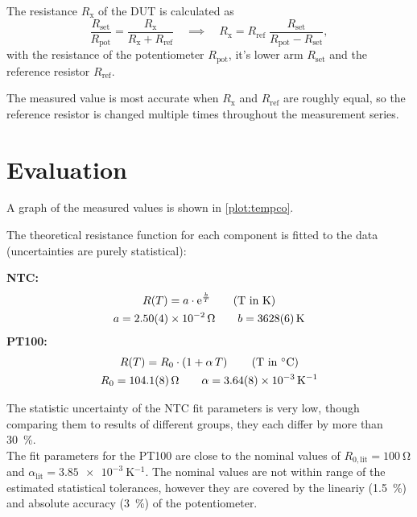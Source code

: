 The resistance $R_\text{x}$ of the DUT is calculated as
\begin{equation}
	\frac{R_\text{set}}{R_\text{pot}} = \frac{R_\text{x}}{R_\text{x} + R_\text{ref}}
	\quad \implies \quad R_\text{x} = R_\text{ref} \; \frac{R_\text{set}}{R_\text{pot} - R_\text{set}},
\end{equation}
with the resistance of the potentiometer $R_\text{pot}$, it's lower arm $R_\text{set}$ and the reference resistor $R_\text{ref}$.

The measured value is most accurate when $R_\text{x}$ and $R_\text{ref}$ are roughly equal, so the reference resistor is changed multiple times throughout the measurement series.

\section{Evaluation}

A graph of the measured values is shown in \autoref{plot:tempco}.

The theoretical resistance function for each component is fitted to the data (uncertainties are purely statistical):

\textbf{NTC:}
\begin{gather*}
	R(T) = a \cdot \mathrm{e}^{\frac{b}{T}} \tag*{(T in \si{\kelvin})}\\
	a = \SI{2.50(4)e-2}{\ohm}	\qquad	b = \SI{3628(6)}{\kelvin}
\end{gather*}
\textbf{PT100:}
\begin{gather*}
	R(T) = R_0 \cdot \left(1 + \alpha \, T \right) \tag*{(T in \si{\celsius})}\\
	R_0 = \SI{104.1(8)}{\ohm}	\qquad	\alpha = \SI{3.64(8)e-3}{\kelvin^{-1}}
\end{gather*}

The statistic uncertainty of the NTC fit parameters is very low, though comparing them to results of different groups, they each differ by more than \SI{30}{\percent}.\\
The fit parameters for the PT100 are close to the nominal values of $R_{0,\text{lit}} = \SI{100}{\ohm}$ and $\alpha_\text{lit} = \SI{3.85e-3}{\kelvin^{-1}}$.
The nominal values are not within range of the estimated statistical tolerances, however they are covered by the lineariy (\SI{1.5}{\percent}) and absolute accuracy (\SI{3}{\percent}) of the potentiometer.


